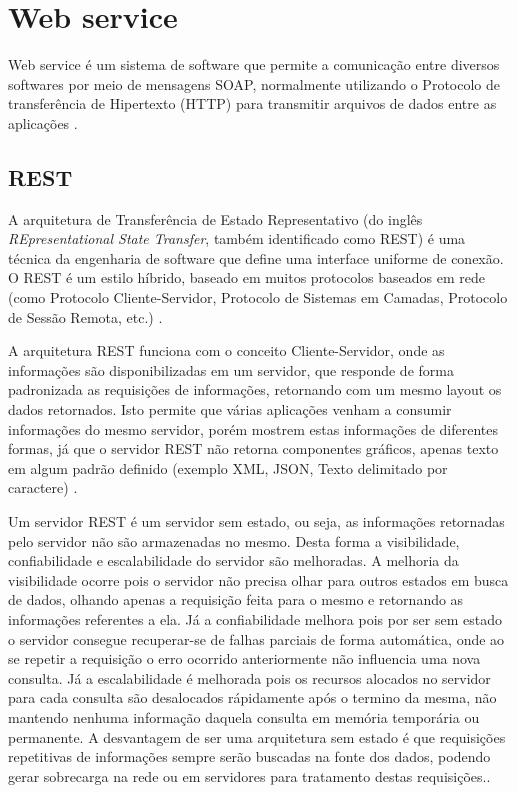 \section{Web service}
Web service é um sistema de software que permite a comunicação entre diversos softwares por meio de mensagens SOAP, normalmente utilizando o Protocolo de transferência de Hipertexto (HTTP) para transmitir arquivos de dados entre as aplicações \cite{W3C}.
\subsection{REST}
A arquitetura de Transferência de Estado Representativo (do inglês \emph{REpresentational State Transfer}, também identificado como REST) é uma técnica da engenharia de software que define uma interface uniforme de conexão. O REST é um estilo híbrido, baseado em muitos protocolos baseados em rede (como Protocolo Cliente-Servidor, Protocolo de Sistemas em Camadas, Protocolo de Sessão Remota, etc.) \cite{RESTFielding}.

A arquitetura REST funciona com o conceito Cliente-Servidor, onde as informações são disponibilizadas em um servidor, que responde de forma padronizada as requisições de informações, retornando com um mesmo layout os dados retornados. Isto permite que várias aplicações venham a consumir informações do mesmo servidor, porém mostrem estas informações de diferentes formas, já que o servidor REST não retorna componentes gráficos, apenas texto em algum padrão definido (exemplo XML, JSON, Texto delimitado por caractere) \cite{RESTFielding}.

Um servidor REST é um servidor sem estado, ou seja, as informações retornadas pelo servidor não são armazenadas no mesmo. Desta forma a visibilidade, confiabilidade e escalabilidade do servidor são melhoradas. A melhoria da visibilidade ocorre pois o servidor não precisa olhar para outros estados em busca de dados, olhando apenas a requisição feita para o mesmo e retornando as informações referentes a ela. Já a confiabilidade melhora pois por ser sem estado o servidor consegue recuperar-se de falhas parciais de forma automática, onde ao se repetir a requisição o erro ocorrido anteriormente não influencia uma nova consulta. Já a escalabilidade é melhorada pois os recursos alocados no servidor para cada consulta são desalocados rápidamente após o termino da mesma, não mantendo nenhuma informação daquela consulta em memória temporária ou permanente. A desvantagem de ser uma arquitetura sem estado é que requisições repetitivas de informações sempre serão buscadas na fonte dos dados, podendo gerar sobrecarga na rede ou em servidores para tratamento destas requisições.\cite{RESTFielding}.


